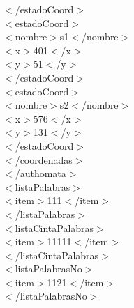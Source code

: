 \documentclass[12pt,a4paper,spanish]{book}
\begin{document}
{\indent \indent $<$/estadoCoord$>$\\

\indent \indent $<$estadoCoord$>$\\

\indent \indent \indent $<$nombre$>$s1$<$/nombre$>$\\

\indent \indent \indent $<$x$>$401$<$/x$>$\\

\indent \indent \indent $<$y$>$51$<$/y$>$\\

\indent \indent $<$/estadoCoord$>$\\

\indent \indent $<$estadoCoord$>$\\

\indent \indent \indent $<$nombre$>$s2$<$/nombre$>$\\

\indent \indent \indent $<$x$>$576$<$/x$>$\\

\indent \indent \indent $<$y$>$131$<$/y$>$\\

\indent \indent $<$/estadoCoord$>$\\

\indent $<$/coordenadas$>$\\

$<$/authomata$>$\\

\indent $<$listaPalabras$>$\\

\indent \indent $<$item$>$111$<$/item$>$\\

\indent $<$/listaPalabras$>$\\

\indent $<$listaCintaPalabras$>$\\

\indent \indent $<$item$>$11111$<$/item$>$\\

\indent $<$/listaCintaPalabras$>$\\

\indent \indent $<$listaPalabrasNo$>$\\

\indent \indent \indent $<$item$>$1121$<$/item$>$\\

\indent \indent $<$/listaPalabrasNo$>$\\

}
\end{document}
